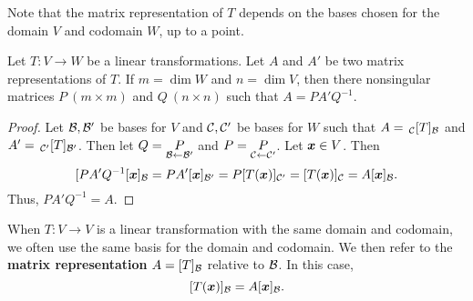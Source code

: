 Note that the matrix representation of $T$ depends on the bases chosen for the domain $V$ and codomain $W$, up to a point. \\

\begin{Thm}\label{thm:similarmatrix} Let $T: V\to W$ be a linear transformations. Let $A$ and $A'$ be two matrix representations of $T$. If $m=\dim W$ and $n=\dim V$, then there nonsingular matrices $P\ (m\times m)$ and $Q\ (n\times n)$ such that $A = PA'Q^{-1}$.
\end{Thm}
\begin{proof} Let $\mathcal{B}, \mathcal{B}'$ be bases for $V$ and $\mathcal{C}, \mathcal{C}'$ be bases for $W$ such that $A = \,_{\mathcal{C}}[T]_{\mathcal{B}}$ and $A' = \,_{\mathcal{C}'}[T]_{\mathcal{B}'}$. Then let $Q = \underset{\mathcal{B}\leftarrow \mathcal{B}'}{P}$ and $P=\underset{\mathcal{C}\leftarrow \mathcal{C}'}{P}$. Let $\boldsymbol x\in V$. Then 
\[[PA'Q^{-1}[\boldsymbol x]_{\mathcal{B}} = PA'[\boldsymbol x]_{\mathcal{B}'} = P[T(\boldsymbol x)]_{\mathcal{C}'} = [T(\boldsymbol x)]_{\mathcal{C}} = A[\boldsymbol x]_{\mathcal{B}}.\] Thus, $PA'Q^{-1} = A$.
\end{proof}\vs

When $T : V \to V$ is a linear transformation with the same domain and codomain, we often use the same basis for the domain and codomain. We then refer to the \textbf{matrix representation} $A = [T]_{\mathcal{B}}$ relative to $\mathcal{B}$. In this case,
\[[T(\boldsymbol x)]_{\mathcal{B}} = A[\boldsymbol x]_{\mathcal{B}}.\]\vs

%
%
%

